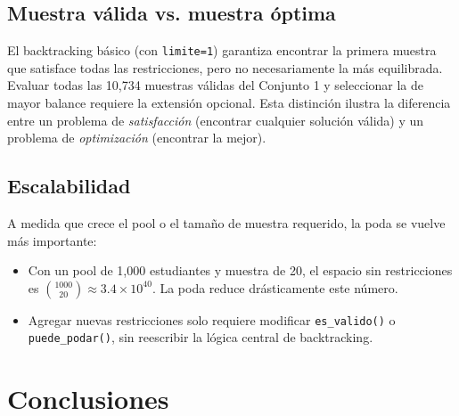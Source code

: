 \documentclass[12pt, a4paper]{article}
\begin{document}
\subsection{Muestra válida vs. muestra óptima}

El backtracking básico (con \texttt{limite=1}) garantiza encontrar la primera muestra que satisface todas las restricciones, pero no necesariamente la más equilibrada. Evaluar todas las 10,734 muestras válidas del Conjunto 1 y seleccionar la de mayor balance requiere la extensión opcional. Esta distinción ilustra la diferencia entre un problema de \emph{satisfacción} (encontrar cualquier solución válida) y un problema de \emph{optimización} (encontrar la mejor).

\subsection{Escalabilidad}

A medida que crece el pool o el tamaño de muestra requerido, la poda se vuelve más importante:

\begin{itemize}[noitemsep]
  \item Con un pool de 1,000 estudiantes y muestra de 20, el espacio sin restricciones es $\binom{1000}{20} \approx 3.4 \times 10^{40}$. La poda reduce drásticamente este número.
  \item Agregar nuevas restricciones solo requiere modificar \texttt{es\_valido()} o \texttt{puede\_podar()}, sin reescribir la lógica central de backtracking.
\end{itemize}

\section{Conclusiones}
\end{document}

